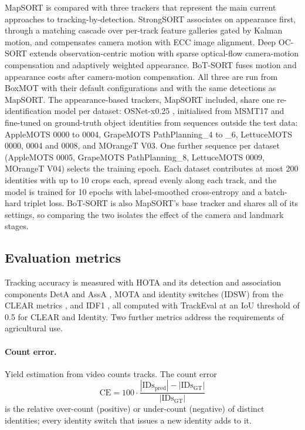 \documentclass[pdflatex,sn-basic]{sn-jnl}%
\theoremstyle{thmstyleone}%
\begin{document}
MapSORT is compared with three trackers that represent the main current approaches to tracking-by-detection. StrongSORT \citep{du2023strongsort} associates on appearance first, through a matching cascade over per-track feature galleries gated by Kalman motion, and compensates camera motion with ECC image alignment. Deep OC-SORT \citep{maggiolino2023deepocsort} extends observation-centric motion with sparse optical-flow camera-motion compensation and adaptively weighted appearance. BoT-SORT \citep{aharon2022botsort} fuses motion and appearance costs after camera-motion compensation. All three are run from BoxMOT \citep{brostrom2024boxmot} with their default configurations and with the same detections as MapSORT. The appearance-based trackers, MapSORT included, share one re-identification model per dataset: OSNet-x0.25 \citep{zhou2019osnet}, initialised from MSMT17 and fine-tuned on ground-truth object identities from sequences outside the test data: AppleMOTS 0000 to 0004, GrapeMOTS PathPlanning\_4 to \_6, LettuceMOTS 0000, 0004 and 0008, and MOrangeT V03. One further sequence per dataset (AppleMOTS 0005, GrapeMOTS PathPlanning\_8, LettuceMOTS 0009, MOrangeT V04) selects the training epoch. Each dataset contributes at most 200 identities with up to 10 crops each, spread evenly along each track, and the model is trained for 10 epochs with label-smoothed cross-entropy and a batch-hard triplet loss. BoT-SORT is also MapSORT's base tracker and shares all of its settings, so comparing the two isolates the effect of the camera and landmark stages.

\subsection{Evaluation metrics}\label{sec:metrics}

Tracking accuracy is measured with HOTA and its detection and association components DetA and AssA \citep{luiten2021hota}, MOTA and identity switches (IDSW) from the CLEAR metrics \citep{bernardin2008clear}, and IDF1 \citep{ristani2016idf1}, all computed with TrackEval \citep{luiten2020trackeval} at an IoU threshold of 0.5 for CLEAR and Identity. Two further metrics address the requirements of agricultural use.

\paragraph{Count error.} Yield estimation from video counts tracks. The count error
\begin{equation}
\mathrm{CE}=100\cdot\frac{|\mathrm{IDs}_{\text{pred}}|-|\mathrm{IDs}_{\text{GT}}|}{|\mathrm{IDs}_{\text{GT}}|}
\end{equation}
is the relative over-count (positive) or under-count (negative) of distinct identities; every identity switch that issues a new identity adds to it.
\end{document}
